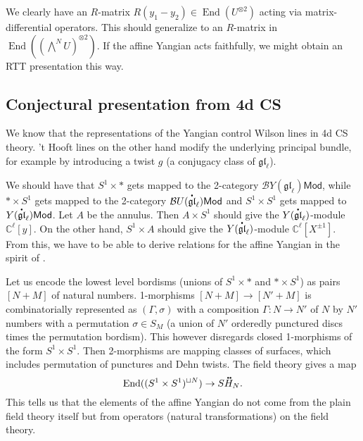\documentclass[11pt]{report}
\newcommand*{\dt}[1]{%
  \accentset{\mbox{\large\bfseries .}}{#1}}
\newcommand*{\ddt}[1]{%
  \accentset{\mbox{\large\bfseries .\hspace{-0.25ex}.}}{#1}}
\theoremstyle{definition}
\theoremstyle{remark}
\theoremstyle{remark}
\newcommand{\End}{\operatorname{End}}
\newcommand{\C}{\mathbb{C}}
\begin{document}
We clearly have an $R$-matrix $R(y_1-y_2) \in \End(U^{\otimes 2})$ acting via matrix-differential operators. This should generalize to an $R$-matrix in $\End((\bigwedge^N U)^{\otimes 2})$. If the affine Yangian acts faithfully, we might obtain an RTT presentation this way.

\subsection{Conjectural presentation from 4d CS}

We know that the representations of the Yangian control Wilson lines in 4d CS theory. 't Hooft lines on the other hand modify the underlying principal bundle, for example by introducing a twist $g$ (a conjugacy class of $\mathfrak{gl}_\ell$).

We should have that $S^1 \times *$ gets mapped to the 2-category $\mathcal{B}Y(\mathfrak{gl}_\ell)\mathsf{Mod}$, while $* \times S^1$ gets mapped to the 2-category $\mathcal{B}U(\dt{\mathfrak{gl}}_\ell)\mathsf{Mod}$ and $S^1 \times S^1$ gets mapped to $Y(\dt{\mathfrak{gl}}_\ell)\mathsf{Mod}$. Let $A$ be the annulus. Then $A \times S^1$ should give the $Y(\dt{\mathfrak{gl}}_\ell)$-module $\C^\ell[y]$. On the other hand, $S^1 \times A$ should give the $Y(\dt{\mathfrak{gl}}_\ell)$-module $\C^\ell[X^{\pm 1}]$. From this, we have to be able to derive relations for the affine Yangian in the spirit of \cite{article:costello:2018b}.

Let us encode the lowest level bordisms (unions of $S^1 \times *$ and $* \times S^1$) as pairs $[N+M]$ of natural numbers. 1-morphisms $[N+M] \to [N'+M]$ is combinatorially represented as $(\Gamma,\sigma)$ with a composition $\Gamma: N \to N'$ of $N$ by $N'$ numbers with a permutation $\sigma \in S_M$ (a union of $N'$ orderedly punctured discs times the permutation bordism). This however disregards closed 1-morphisms of the form $S^1 \times S^1$. Then 2-morphisms are mapping classes of surfaces, which includes permutation of punctures and Dehn twists. The field theory gives a map
\begin{equation*}
\End((S^1 \times S^1)^{\sqcup N}) \to S \ddt H_N.
\end{equation*}
This tells us that the elements of the affine Yangian do not come from the plain field theory itself but from operators (natural transformations) on the field theory.
\end{document}
